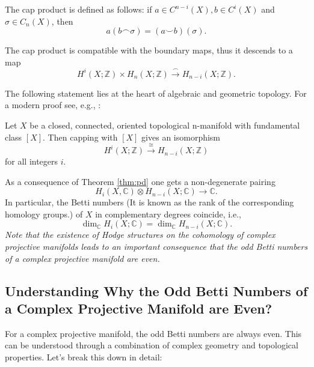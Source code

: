 \documentclass[lang=en,12pt]{beautybook}
\begin{document}
The cap product is defined as follows: if $a \in C^{n-i}(X), b \in C^i(X)$ and $\sigma \in C_n(X)$, then
$$
  a(b \frown \sigma)=(a \smile b)(\sigma).
$$

The cap product is compatible with the boundary maps, thus it descends to a map
$$
  H^i(X ; \mathbb{Z}) \times H_n(X ; \mathbb{Z}) \xrightarrow{\frown} H_{n-i}(X ; \mathbb{Z}).
$$


The following statement lies at the heart of algebraic and geometric topology. For a modern proof see, e.g.,  \cite[Section 3.3]{hatcher2002algebraic}:
\begin{theorem}
  Let $X$ be a closed, connected, oriented topological n-manifold with fundamental class $[X]$. Then capping with $[X]$ gives an isomorphism
  $$
    H^i(X ; \mathbb{Z}) \xrightarrow{\cong} H_{n-i}(X ; \mathbb{Z})
  $$
  for all integers $i$.
\end{theorem}
As a consequence of Theorem \ref{thm:pd} one gets a non-degenerate pairing
$$
  H_i(X, \mathbb{C}) \otimes H_{n-i}(X ; \mathbb{C}) \longrightarrow \mathbb{C}.
$$
In particular, the Betti numbers (It is known as the rank of the corresponding homology groups.) of $X$ in complementary degrees coincide, i.e.,
$$
  \operatorname{dim}_{\mathbb{C}} H_i(X ; \mathbb{C})=\operatorname{dim}_{\mathbb{C}} H_{n-i}(X ; \mathbb{C}).
$$
\textit{Note that the existence of Hodge structures on the cohomology of complex projective manifolds leads to an important consequence that the odd Betti numbers of a complex projective manifold are even. }


\subsection{Understanding Why the Odd Betti Numbers of a Complex Projective Manifold are Even?}

For a complex projective manifold, the odd Betti numbers are always even. This can be understood through a combination of complex geometry and topological properties. Let’s break this down in detail:
\end{document}
